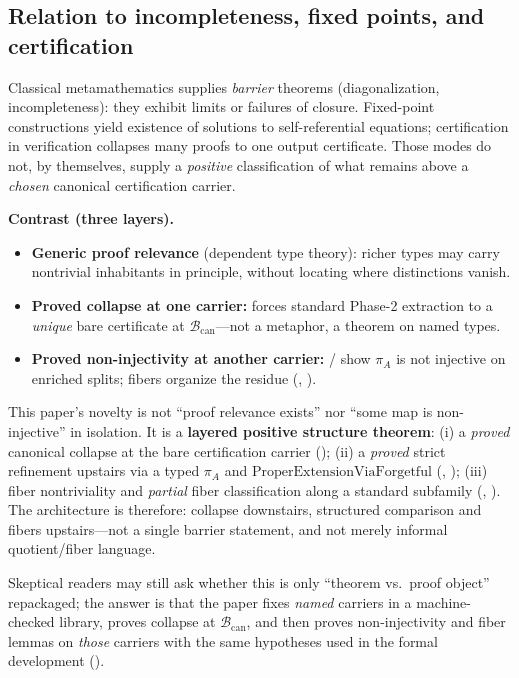 \documentclass[11pt]{article}
\begin{document}
\subsection{Relation to incompleteness, fixed points, and certification}\label{sec:intro-comparison}
Classical metamathematics supplies \emph{barrier} theorems (diagonalization, incompleteness): they exhibit limits or failures of closure. Fixed-point constructions yield existence of solutions to self-referential equations; certification in verification collapses many proofs to one output certificate. Those modes do not, by themselves, supply a \emph{positive} classification of what remains above a \emph{chosen} canonical certification carrier.

\smallskip
\noindent\textbf{Contrast (three layers).}
\begin{itemize}[leftmargin=2em]
  \item \textbf{Generic proof relevance} (dependent type theory): richer types may carry nontrivial inhabitants in principle, without locating where distinctions vanish.
  \item \textbf{Proved collapse at one carrier:}  forces standard Phase-2 extraction to a \emph{unique} bare certificate at $\mathcal{B}_{\mathrm{can}}$---not a metaphor, a theorem on named types.
  \item \textbf{Proved non-injectivity at another carrier:}  /  show $\pi_A$ is not injective on enriched splits; fibers organize the residue (, ).
\end{itemize}

This paper's novelty is not ``proof relevance exists'' nor ``some map is non-injective'' in isolation. It is a \textbf{layered positive structure theorem}: (i) a \emph{proved} canonical collapse at the bare certification carrier (); (ii) a \emph{proved} strict refinement upstairs via a typed $\pi_A$ and $\mathrm{ProperExtensionViaForgetful}$ (, ); (iii) fiber nontriviality and \emph{partial} fiber classification along a standard subfamily (, ). The architecture is therefore: collapse downstairs, structured comparison and fibers upstairs---not a single barrier statement, and not merely informal quotient/fiber language.

Skeptical readers may still ask whether this is only ``theorem vs.\ proof object'' repackaged; the answer is that the paper fixes \emph{named} carriers in a machine-checked library, proves collapse at $\mathcal{B}_{\mathrm{can}}$, and then proves non-injectivity and fiber lemmas on \emph{those} carriers with the same hypotheses used in the formal development ().
\end{document}
